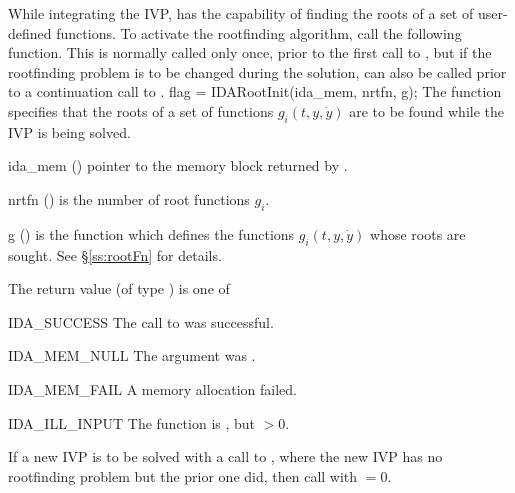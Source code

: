 {While integrating the IVP, {\idas} has the capability of finding the
roots of a set of user-defined functions. To activate the rootfinding 
algorithm, call the following function.  This is normally called only
once, prior to the first call to , but if the rootfinding
problem is to be changed during the solution,  can also
be called prior to a continuation call to . 
{
  flag = IDARootInit(ida\_mem, nrtfn, g);
}
{
  The function  specifies that the roots of a set of
  functions $g_i(t,y,\dot{y})$ are to be found while the IVP is being solved.
}
{
  \begin{args}
  \item[ida\_mem] ()
    pointer to the {\idas} memory block returned by .
  \item[nrtfn] ()
    is the number of root functions $g_i$.
  \item[g] ()
    is the {\CC} function which defines the  functions $g_i(t,y,\dot{y})$
    whose roots are sought. See \S\ref{ss:rootFn} for details.
 \end{args}
}
{
  The return value  (of type ) is one of
  \begin{args}
  \item[IDA\_SUCCESS]
    The call to  was successful.
  \item[IDA\_MEM\_NULL]
    The  argument was .
  \item[IDA\_MEM\_FAIL]
    A memory allocation failed.
  \item[IDA\_ILL\_INPUT]
    The function  is , but $>0$.
  \end{args}
}
{
  If a new IVP is to be solved with a call to , where the new
  IVP has no rootfinding problem but the prior one did, then call
   with $=0$.
}



}
